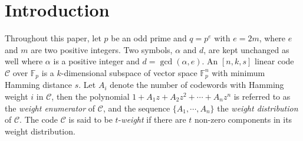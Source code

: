 \documentclass[final,1p,times]{elsarticle}
\begin{document}

\section{Introduction}\label{intro}
Throughout this paper, let $ p $ be an odd prime and $ q=p^{e} $ with $ e=2m $, where  $ e $ and $ m $ are two positive integers. Two symbols, $ \alpha $ and $ d $, are kept unchanged as well where $  \alpha $ is a positive integer and $ d=\gcd(\alpha,e)$. An $ [n,k,s] $ linear code $ \mathcal{C} $ over $ \mathbb{F}_{p} $ is a $ k $-dimensional subspace of vector space $ \mathbb{F}_{p}^{n} $ with  minimum Hamming distance $ s $. Let $ A_{i} $ denote the number of codewords with Hamming weight $ i $ in $ \mathcal{C} $, then the polynomial $1+A_{1}z+ A_{2}z^{2}+\cdots+  A_{n}z^{n}$ is referred to as the \textit{weight enumerator} of $ \mathcal{C} $, and the sequence $\lbrace A_{1},\cdots,A_{n} \rbrace$ the \textit{weight distribution} of $ \mathcal{C} $. The code $ \mathcal{C} $ is said to be $ t $-\textit{weight} if there are $ t $ non-zero components in its weight distribution. 
\end{document}
